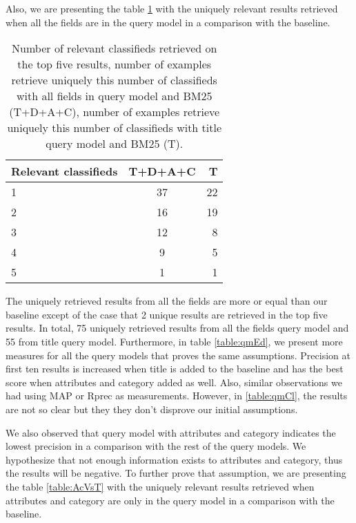 Also, we are presenting the table \ref{table:allVST} with the uniquely relevant results retrieved when all the fields are in the query model in a comparison with the baseline.


\begin{table}[H]
\begin{center}
\caption{Number of relevant classifieds retrieved on the top five results, number of examples retrieve uniquely this number of classifieds with all fields in query model and BM25 (T+D+A+C), number of examples retrieve uniquely this number of classifieds with title query model and BM25 (T).}
\label{table:allVST}

\begin{tabular}{lcr}
\midrule
Relevant classifieds &  T+D+A+C & T \\
\midrule
	1 & 37 & 22 \\
	2 & 16 & 19 \\
	3 & 12 & 8 \\
	4 & 9 & 5  \\
	5 & 1 & 1 \\
\bottomrule
\end{tabular}
\end{center}
\end{table}




The uniquely retrieved results from all the fields are more or equal than our baseline except of the case that 2 unique results are retrieved in the top five results. In total, 75 uniquely retrieved results from all the fields query model and 55 from title query model. Furthermore, in table \ref{table:qmEd}, we present more measures for all the query models that proves the same assumptions. Precision at first ten results is increased when title is added to the baseline and has the best score when attributes and category added as well. Also, similar observations we had using MAP or Rprec as measurements. However, in \ref{table:qmCl}, the results are not so clear but they they don't disprove our initial assumptions.

We also observed that query model with attributes and category indicates the lowest precision in a comparison with the rest of the query models. We hypothesize that not enough information exists to attributes and category, thus the results will be negative. To further prove that assumption, we are presenting the table \ref{table:AcVsT} with the uniquely relevant results retrieved when attributes and category are only in the query model in a comparison with the baseline.


